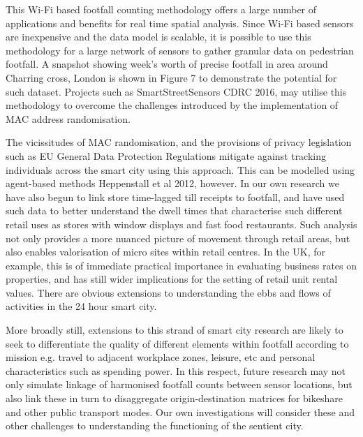 This Wi-Fi based footfall counting methodology offers a large number of
applications and benefits for real time spatial analysis. Since Wi-Fi based
sensors are inexpensive and the data model is scalable, it is possible to use
this methodology for a large network of sensors to gather granular data on
pedestrian footfall. A snapshot showing week’s worth of precise footfall in area
around Charring cross, London is shown in Figure 7 to demonstrate the potential
for such dataset. Projects such as SmartStreetSensors CDRC 2016, may utilise
this methodology to overcome the challenges introduced by the implementation of
MAC address randomisation.

The vicissitudes of MAC randomisation, and the provisions of privacy legislation
such as EU General Data Protection Regulations mitigate against tracking
individuals across the smart city using this approach.  This can be modelled
using agent-based methods Heppenstall et al 2012, however. In our own research
we have also begun to link store time-lagged till receipts to footfall, and have
used such data to better understand the dwell times that characterise such
different retail uses as stores with window displays and fast food restaurants.
Such analysis not only provides a more nuanced picture of movement through
retail areas, but also enables valorisation of micro sites within retail
centres. In the UK, for example, this is of immediate practical importance in
evaluating business rates on properties, and has still wider implications for
the setting of retail unit rental values. There are obvious extensions to
understanding the ebbs and flows of activities in the 24 hour smart city.

More broadly still, extensions to this strand of smart city research are likely
to seek to differentiate the quality of different elements within footfall
according to mission e.g. travel to adjacent workplace zones, leisure, etc and
personal characteristics such as spending power. In this respect, future
research may not only simulate linkage of harmonised footfall counts between
sensor locations, but also link these in turn to disaggregate origin-destination
matrices for bikeshare and other public transport modes.  Our own investigations
will consider these and other challenges to understanding the functioning of the
sentient city.
